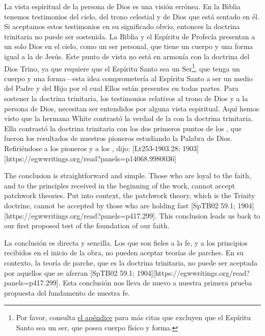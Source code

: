 La vista espiritual de la persona de Dios es una visión errónea. En la Biblia tenemos testimonios del cielo, del trono celestial y de Dios que está sentado en él. Si aceptamos estos testimonios en su significado obvio, entonces la doctrina trinitaria no puede ser sostenida. La Biblia y el Espíritu de Profecía presentan a un solo Dios en el cielo, como un ser personal, que tiene un cuerpo y una forma igual a la de Jesús. Este punto de vista no está en armonía con la doctrina del Dios Trino, ya que requiere que el Espíritu Santo sea un Ser\footnote{Por favor, consulta \hyperref[appendix:unauthenticated-reports]{el apéndice} para más citas que excluyen que el Espíritu Santo sea un ser, que posea cuerpo físico y forma.}, que tenga un cuerpo y una forma—esta idea comprometería al Espíritu Santo a ser un medio del Padre y del Hijo por el cual Ellos están presentes en todas partes. Para sostener la doctrina trinitaria, los testimonios relativos al trono de Dios y a la persona de Dios, necesitan ser entendidos por alguna vista espiritual. Aquí hemos visto que la hermana White contrastó la verdad de la  con la doctrina trinitaria. Ella contrastó la doctrina trinitaria con los dos primeros puntos de los , que fueron los resultados de nuestros pioneros estudiando la Palabra de Dios. Refiriéndose a los pioneros y a los , dijo: [Lt253-1903.28; 1903][https://egwwritings.org/read?panels=p14068.9980036]


The conclusion is straightforward and simple. Those who are loyal to the faith, and to the principles received in the beginning of the work, cannot accept patchwork theories. Put into context, the patchwork theory, which is the Trinity doctrine, cannot be accepted by those who are holding fast [SpTB02 59.1; 1904][https://egwwritings.org/read?panels=p417.299]. This conclusion leads us back to our first proposed test of the foundation of our faith.


La conclusión es directa y sencilla. Los que son fieles a la fe, y a los principios recibidos en el inicio de la obra, no pueden aceptar teorías de parches. En su contexto, la teoría de parche, que es la doctrina trinitaria, no puede ser aceptada por aquellos que se aferran [SpTB02 59.1; 1904][https://egwwritings.org/read?panels=p417.299]. Esta conclusión nos lleva de nuevo a nuestra primera prueba propuesta del fundamento de nuestra fe.




% 
